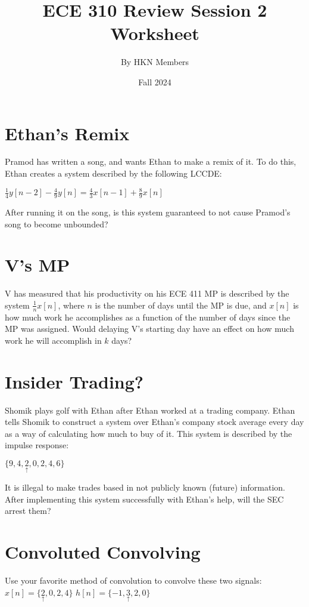 \documentclass{article}
\title{ECE 310 Review Session 2 Worksheet}
\author{By HKN Members}
\date{Fall 2024}
\begin{document}
\maketitle

\section{Ethan's Remix}
Pramod has written a song, and wants Ethan to make a remix of it. To do this, Ethan creates a system described by the following LCCDE:

$ \frac{1}{4} y[n-2] - \frac{4}{9} y[n] = \frac{4}{3} x[n-1] + \frac{8}{9} x[n]$

After running it on the song, is this system guaranteed to not cause Pramod's song to become unbounded?

\section{V's MP}
V has measured that his productivity on his ECE 411 MP is described by the system $\frac{1}{n} x[n]$, where $n$ is the number of days until the MP is due, and $x[n]$ is how much work he accomplishes as a function of the number of days since the MP was assigned. Would delaying V's starting day have an effect on how much work he will accomplish in $k$ days?

\section{Insider Trading?}

Shomik plays golf with Ethan after Ethan worked at a trading company. Ethan tells Shomik to construct a system over Ethan's company stock average every day as a way of calculating how much to buy of it. This system is described by the impulse response:

$\{9,4,\underset{\uparrow}{2},0,2,4,6\}$


It is illegal to make trades based in not publicly known (future) information. After implementing this system successfully with Ethan's help, will the SEC arrest them?

\section{Convoluted Convolving}
Use your favorite method of convolution to convolve these two signals:
\newline
\indent \indent \indent \indent 
$x[n]=\{\underset{\uparrow}{2},0,2,4\}$ \indent \indent $h[n]=\{-1,\underset{\uparrow}{3},2,0\}$
\end{document}
